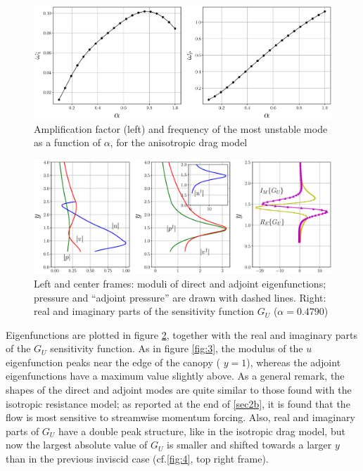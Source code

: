\begin{figure}[h]
	\centering
	\includegraphics[width=1\linewidth]{chapter_3/figure/6}
	\caption{Amplification factor (left) and frequency of the most unstable mode as a function of $\alpha$, for the anisotropic drag
		model}
	\label{fig:6}
\end{figure}

\begin{figure}[h]
	\centering
	\includegraphics[width=1\linewidth]{chapter_3/figure/7}
	\caption{Left and center frames: moduli of direct and adjoint eigenfunctions; pressure and “adjoint pressure” are drawn with
		dashed lines. Right: real and imaginary parts of the sensitivity function $G_U$ ($\alpha = 0.4790$)}
	\label{fig:7}
\end{figure}

Eigenfunctions are plotted in figure \ref{fig:7}, together with the real and imaginary parts of the $G_U$
sensitivity function. As in figure \ref{fig:3}, the modulus of the $u$ eigenfunction peaks near the edge of the
canopy ( $y = 1$), whereas the adjoint eigenfunctions have a maximum value slightly above. As a
general remark, the shapes of the direct and adjoint modes are quite similar to those found with
the isotropic resistance model; as reported at the end of \ref{sec2b}, it is found that the flow
is most sensitive to streamwise momentum forcing. Also, real and imaginary parts of $G_U$ have a
double peak structure, like in the isotropic drag model, but now the largest absolute value of $G_U$ is smaller and shifted towards a larger $y$ than in the previous inviscid case (cf.\ref{fig:4}, top right frame).

